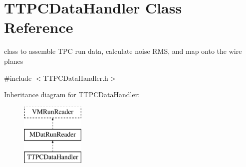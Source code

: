 \hypertarget{class_t_t_p_c_data_handler}{\section{T\+T\+P\+C\+Data\+Handler Class Reference}
\label{class_t_t_p_c_data_handler}
}


class to assemble T\+P\+C run data, calculate noise R\+M\+S, and map onto the wire planes  




{\ttfamily \#include $<$T\+T\+P\+C\+Data\+Handler.\+h$>$}

Inheritance diagram for T\+T\+P\+C\+Data\+Handler\+:\begin{figure}[H]
\begin{center}
\leavevmode
\includegraphics[height=3.000000cm]{class_t_t_p_c_data_handler}
\end{center}
\end{figure}
